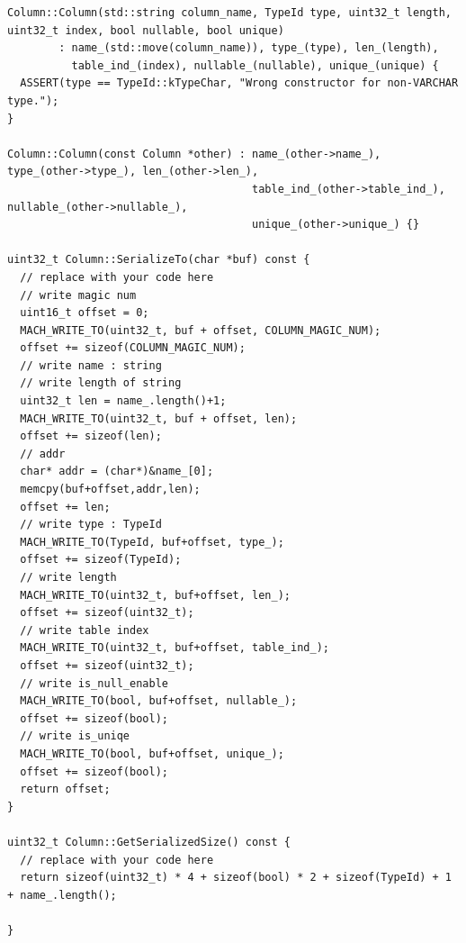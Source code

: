 \documentclass{article}
\begin{document}
\begin{appendices}
\begin{lstlisting}
Column::Column(std::string column_name, TypeId type, uint32_t length, uint32_t index, bool nullable, bool unique)
        : name_(std::move(column_name)), type_(type), len_(length),
          table_ind_(index), nullable_(nullable), unique_(unique) {
  ASSERT(type == TypeId::kTypeChar, "Wrong constructor for non-VARCHAR type.");
}

Column::Column(const Column *other) : name_(other->name_), type_(other->type_), len_(other->len_),
                                      table_ind_(other->table_ind_), nullable_(other->nullable_),
                                      unique_(other->unique_) {}

uint32_t Column::SerializeTo(char *buf) const {
  // replace with your code here
  // write magic num
  uint16_t offset = 0;
  MACH_WRITE_TO(uint32_t, buf + offset, COLUMN_MAGIC_NUM);
  offset += sizeof(COLUMN_MAGIC_NUM);
  // write name : string
  // write length of string
  uint32_t len = name_.length()+1;
  MACH_WRITE_TO(uint32_t, buf + offset, len);
  offset += sizeof(len);
  // addr
  char* addr = (char*)&name_[0];
  memcpy(buf+offset,addr,len);
  offset += len;
  // write type : TypeId
  MACH_WRITE_TO(TypeId, buf+offset, type_);
  offset += sizeof(TypeId);
  // write length
  MACH_WRITE_TO(uint32_t, buf+offset, len_);
  offset += sizeof(uint32_t);
  // write table index
  MACH_WRITE_TO(uint32_t, buf+offset, table_ind_);
  offset += sizeof(uint32_t);
  // write is_null_enable
  MACH_WRITE_TO(bool, buf+offset, nullable_);
  offset += sizeof(bool);
  // write is_uniqe
  MACH_WRITE_TO(bool, buf+offset, unique_);
  offset += sizeof(bool);
  return offset;
}

uint32_t Column::GetSerializedSize() const {
  // replace with your code here
  return sizeof(uint32_t) * 4 + sizeof(bool) * 2 + sizeof(TypeId) + 1 + name_.length();

}


\end{lstlisting}
\end{appendices}
\end{document}
